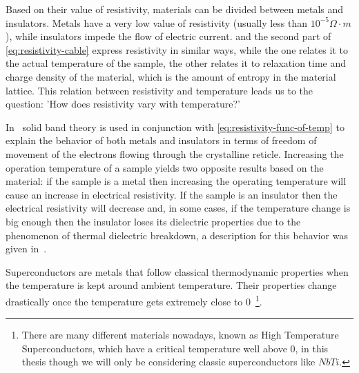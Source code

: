 \medskip

Based on their value of resistivity, materials can be divided between metals and insulators. Metals
have a very low value of resistivity (usually less than $10^{-5}\Omega\cdot m$), while insulators impede the
flow of electric current.  and the second part of
\cref{eq:resistivity-cable} express resistivity in similar ways, while the one relates it to the
actual temperature of the sample, the other relates it to relaxation time and charge density of the
material, which is the amount of entropy in the material lattice. This relation between resistivity
and temperature leads us to the question: 'How does resistivity vary with temperature?'

\smallskip

In~\cite{slimani2022superconducting} solid band theory is used in conjunction with
\cref{eq:resistivity-func-of-temp} to explain the behavior of both metals and insulators in terms of
freedom of movement of the electrons flowing through the crystalline reticle. Increasing the
operation temperature of a sample yields two opposite results based on the material: if the sample
is a metal then increasing the operating temperature will cause an increase in electrical
resistivity. If the sample is an insulator then the electrical resistivity will decrease and, in
some cases, if the temperature change is big enough then the insulator loses its dielectric
properties due to the phenomenon of thermal dielectric breakdown, a description for this behavior
was given in~\cite{kuvyrkin2022}.

Superconductors are metals that follow classical thermodynamic properties when the temperature is
kept around ambient temperature. Their properties change drastically once the temperature gets
extremely close to $0$\K~\footnote{There are many different materials nowadays, known as High Temperature
	Superconductors, which have a critical temperature well above $0$\K, in this thesis though we will
	only be considering classic superconductors like $NbTi$.
}.

\smallskip

